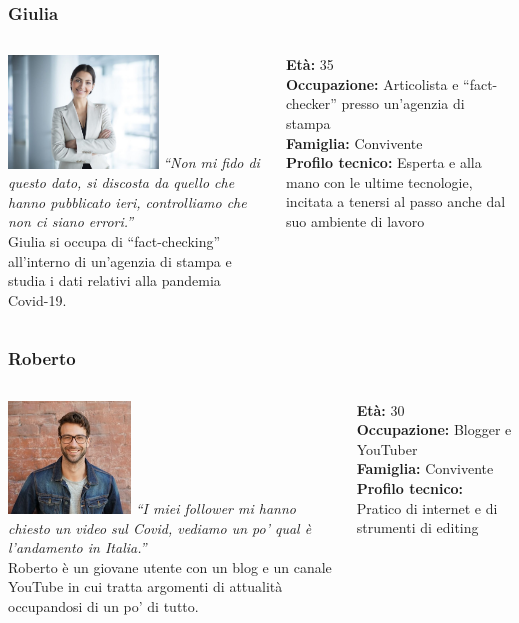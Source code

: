 \documentclass[handout]{beamer}
\begin{document}
		\begin{frame}
			\frametitle{Giulia}
			\begin{columns}[t]
				\begin{column}[T]{6cm}
					\includegraphics[height=3cm]{img/giulia}
					\textit{``Non mi fido di questo dato, si discosta da quello che hanno pubblicato ieri, controlliamo che non ci siano errori.''}\\
					Giulia si occupa di ``fact-checking'' all'interno di un'agenzia di stampa e studia i dati relativi alla pandemia Covid-19.
				\end{column}
				\begin{column}[T]{5cm}
					\textbf{Età:} 35\\
					\textbf{Occupazione:} Articolista e ``fact-checker'' presso un'agenzia di stampa\\
					\textbf{Famiglia:} Convivente\\
					\textbf{Profilo tecnico:} Esperta e alla mano con le ultime tecnologie, incitata a tenersi al passo anche dal suo ambiente di lavoro\\
				\end{column}
			\end{columns}
		\end{frame}

		\begin{frame}
			\frametitle{Roberto}
			\begin{columns}[t]
				\begin{column}[T]{6cm}
					\includegraphics[height=3cm]{img/francesco}
					\textit{``I miei follower mi hanno chiesto un video sul Covid, vediamo un po' qual è l'andamento in Italia.''}\\
					Roberto è un giovane utente con un blog e un canale YouTube in cui tratta argomenti di attualità occupandosi di un po' di tutto.
				\end{column}
				\begin{column}[T]{5cm}
					\textbf{Età:} 30\\
					\textbf{Occupazione:} Blogger e YouTuber\\
					\textbf{Famiglia:} Convivente\\
					\textbf{Profilo tecnico:} Pratico di internet e di strumenti di editing\\
				\end{column}
			\end{columns}
		\end{frame}
\end{document}
